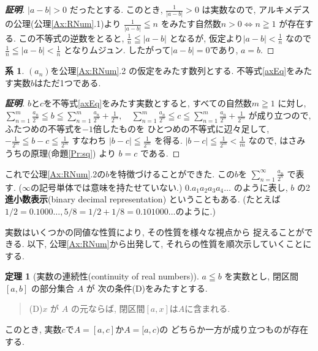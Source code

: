 \documentclass[11pt, a4paper, dvipdfmx]{jsarticle}
\theoremstyle{definition}
\newtheorem{Theorem}[Axiom]{定理}
\newtheorem{Corollary}[Axiom]{系}
\newcommand{\dip}{\displaystyle}
\numberwithin{equation}{section} %
\begin{document}
\begin{proof}[{\bf 証明}]
  $|a-b|>0$ だったとする. 
  このとき, $\dip\frac{1}{|a-b|}>0$ は実数なので, 
  アルキメデスの公理(公理\ref{Ax:RNum}.1)より
  $\dip \frac{1}{\left|a-b\right|}\leqq n$ 
  をみたす自然数$n>0 \Leftrightarrow n\geqq1$
  が存在する. この不等式の逆数をとると, 
  $\dip \frac{1}{n}\leqq |a-b|$
  となるが, 仮定より$\dip|a-b| < \frac{1}{n}$
  なので
  $\dip \frac{1}{n}\leqq|a-b| < \frac{1}{n}$
  となりムジュン. したがって$|a-b|=0$であり, $a=b$.
\end{proof}

\begin{Corollary}
  $(a_n)$を公理{\ref{Ax:RNum}.2} の仮定をみたす数列とする. 
  不等式\eqref{axEq}をみたす実数$b$はただ1つである. 
\end{Corollary}

\begin{proof}[{\bf 証明}]
  $b$と$c$を不等式\eqref{axEq}をみたす実数とすると, 
  すべての自然数$m\geqq 1$ に対し, 
  $\dip
  \sum_{n=1}^{m}\frac{a_n}{2^n} 
  \leqq b 
  \leqq \sum_{n=1}^{m}\frac{a_n}{2^n} + \frac{1}{2^m}, 
  \quad
  \sum_{n=1}^{m}\frac{a_n}{2^n} 
  \leqq c 
  \leqq \sum_{n=1}^{m}\frac{a_n}{2^n} + \frac{1}{2^m}$
  が成り立つので, ふたつめの不等式を$-1$倍したものを
  ひとつめの不等式に辺々足して, 
  $\dip -\frac{1}{2^m} \leqq b - c \leqq \frac{1}{2^m}$
  すなわち 
  $\dip |b - c| \leqq \frac{1}{2^m}$ を得る. 
  $\dip |b - c| \leqq \frac{1}{2^m} < \frac{1}{m}$
  なので, はさみうちの原理(命題\ref{Pr:sq}) より $b=c$ である. 
\end{proof}

これで公理{\ref{Ax:RNum}.2}の$b$を特徴づけることができた. 
この$b$を
$\dip
  \sum_{n=1}^{\infty}\frac{a_n}{2^n}
$
で表す. ($\infty$の記号単体では意味を持たせていない.)
$0.a_1a_2a_3a_4\dots$ のように表し, 
$b$ の2{\bf 進小数表示}(binary decimal representation)
ということもある. (たとえば $1/2=0.1000\dots, 
5/8=1/2+1/8=0.101000\dots$のように.)


実数はいくつかの同値な性質により, その性質を様々な視点から
捉えることができる. 以下, 公理\ref{Ax:RNum}から出発して, 
それらの性質を順次示していくことにする. 

\begin{Theorem}[実数の連続性(continuity of real numbers)]\label{conOfR1}
    $a\leqq b$ を実数とし, 閉区間 $[a,b]$ の部分集合 $A$ が
    次の条件(D)をみたすとする. 
    \begin{quote}\label{aa}
        (D)\quad $x$ が $A$ の元ならば, 閉区間$[a,x]$は$A$に含まれる.
    \end{quote}
    このとき, 実数$c$で$A=[a,c]$か$A = [a,c)$の
    どちらか一方が成り立つものが存在する. 
\end{Theorem}
\end{document}
